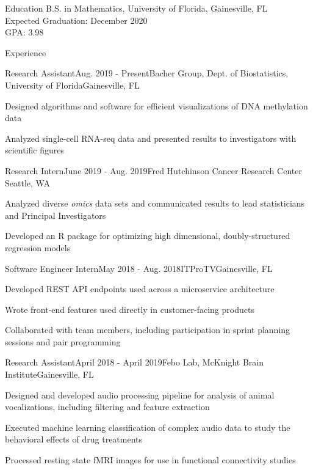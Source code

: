 \documentclass{resume}
\begin{document}
 
 
\begin{rSection}{Education} 
B.S. in Mathematics, University of Florida, Gainesville, FL \\
Expected Graduation: December 2020 \\
GPA: 3.98

\end{rSection}


\begin{rSection}{Experience}

\begin{rSubsection}{Research Assistant}{Aug. 2019 - Present}{Bacher Group, Dept. of
Biostatistics, University of Florida}{Gainesville, FL}
  \item Designed algorithms and software for efficient visualizations
    of DNA methylation data
  \item Analyzed single-cell RNA-seq data and presented results to
    investigators with scientific figures
\end{rSubsection}

\begin{rSubsection}{Research Intern}{June 2019 - Aug. 2019}{Fred Hutchinson Cancer Research Center}
{Seattle, WA}
  \item Analyzed diverse \textit{omics} data sets and communicated results to
    lead statisticians and Principal Investigators
   \item Developed an R package for optimizing high dimensional,
      doubly-structured regression models
\end{rSubsection}

\begin{rSubsection}{Software Engineer Intern}{May 2018 - Aug. 2018}{ITProTV}{Gainesville, FL}
 \item Developed REST API endpoints used across a microservice architecture
 \item Wrote front-end features used directly in customer-facing products
 \item Collaborated with team members, including participation in sprint planning sessions and pair programming
\end{rSubsection} 

\begin{rSubsection}{Research Assistant}{April 2018 - April 2019}{Febo Lab, McKnight Brain Institute}{Gainesville, FL}
      \item Designed and developed audio processing pipeline for analysis of animal vocalizations, including filtering and feature extraction
      \item Executed machine learning classification of complex audio data to study the behavioral effects of drug treatments
      \item Processed resting state fMRI images for use in functional connectivity studies
\end{rSubsection}


\end{rSection}
\end{document}

